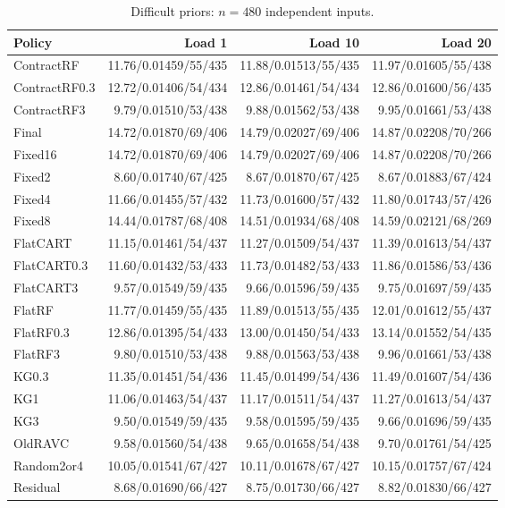 \begin{table}[!htbp]\centering\scriptsize
\caption{Difficult priors: $n=480$ independent inputs.}\label{supp:confirmdifficult_confirmation}
\begin{tabular}{@{}lrrr@{}}\toprule
Policy & Load 1 & Load 10 & Load 20\\\midrule
ContractRF & 11.76/0.01459/55/435 & 11.88/0.01513/55/435 & 11.97/0.01605/55/438\\
ContractRF0.3 & 12.72/0.01406/54/434 & 12.86/0.01461/54/434 & 12.86/0.01600/56/435\\
ContractRF3 & 9.79/0.01510/53/438 & 9.88/0.01562/53/438 & 9.95/0.01661/53/438\\
Final & 14.72/0.01870/69/406 & 14.79/0.02027/69/406 & 14.87/0.02208/70/266\\
Fixed16 & 14.72/0.01870/69/406 & 14.79/0.02027/69/406 & 14.87/0.02208/70/266\\
Fixed2 & 8.60/0.01740/67/425 & 8.67/0.01870/67/425 & 8.67/0.01883/67/424\\
Fixed4 & 11.66/0.01455/57/432 & 11.73/0.01600/57/432 & 11.80/0.01743/57/426\\
Fixed8 & 14.44/0.01787/68/408 & 14.51/0.01934/68/408 & 14.59/0.02121/68/269\\
FlatCART & 11.15/0.01461/54/437 & 11.27/0.01509/54/437 & 11.39/0.01613/54/437\\
FlatCART0.3 & 11.60/0.01432/53/433 & 11.73/0.01482/53/433 & 11.86/0.01586/53/436\\
FlatCART3 & 9.57/0.01549/59/435 & 9.66/0.01596/59/435 & 9.75/0.01697/59/435\\
FlatRF & 11.77/0.01459/55/435 & 11.89/0.01513/55/435 & 12.01/0.01612/55/437\\
FlatRF0.3 & 12.86/0.01395/54/433 & 13.00/0.01450/54/433 & 13.14/0.01552/54/435\\
FlatRF3 & 9.80/0.01510/53/438 & 9.88/0.01563/53/438 & 9.96/0.01661/53/438\\
KG0.3 & 11.35/0.01451/54/436 & 11.45/0.01499/54/436 & 11.49/0.01607/54/436\\
KG1 & 11.06/0.01463/54/437 & 11.17/0.01511/54/437 & 11.27/0.01613/54/437\\
KG3 & 9.50/0.01549/59/435 & 9.58/0.01595/59/435 & 9.66/0.01696/59/435\\
OldRAVC & 9.58/0.01560/54/438 & 9.65/0.01658/54/438 & 9.70/0.01761/54/425\\
Random2or4 & 10.05/0.01541/67/427 & 10.11/0.01678/67/427 & 10.15/0.01757/67/424\\
Residual & 8.68/0.01690/66/427 & 8.75/0.01730/66/427 & 8.82/0.01830/66/427\\
\bottomrule\end{tabular}\end{table}

